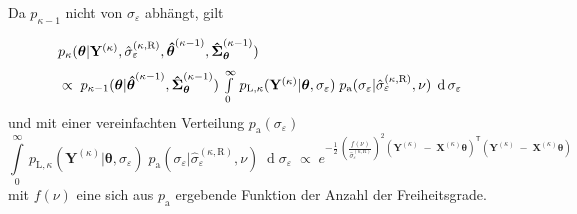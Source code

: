 Da $p_{\kappa-1}$ nicht von $\sigma_{\varepsilon}$ abhängt, gilt
\begin{equation}
\arraycolsep=2.0pt\def\arraystretch{2.0}
\begin{array}{l}
p_{\kappa}(\boldsymbol{\theta}| \mathbf{Y}^{(\kappa)}, \hat \sigma_{\varepsilon}^{(\kappa,\mathrm{R})},  \boldsymbol{\hat \theta}^{(\kappa-1)},  \boldsymbol{\hat \Sigma}^{(\kappa-1)}_{\boldsymbol{\theta}}) \\
\; \propto \; p_{\kappa-1}(\boldsymbol{\theta} | \boldsymbol{\hat \theta}^{(\kappa-1)}, 
\boldsymbol{\hat \Sigma}^{(\kappa-1)}_{\boldsymbol{\theta}}) \, 
\int\limits_0^\infty \, p_{\mathrm{L},\kappa} (\mathbf{Y}^{(\kappa)} | \boldsymbol{\theta},
\sigma_{\varepsilon}) \;
p_{\mathrm{a}} (\sigma_{\varepsilon} | \hat \sigma_{\varepsilon}^{(\kappa,\mathrm{R})}, \nu) \;
\operatorname{d}\sigma_{\varepsilon}
\end{array}
\end{equation}
und mit einer vereinfachten Verteilung $p_{\mathrm{a}}(\sigma_{\varepsilon})$
\begin{equation}
\int\limits_0^\infty \, p_{\mathrm{L},\kappa} (\mathbf{Y}^{(\kappa)} |
\boldsymbol{\theta}, \sigma_{\varepsilon}) \;
p_{\mathrm{a}} (\sigma_{\varepsilon} | \hat \sigma_{\varepsilon}^{(\kappa,\mathrm{R})}, \nu) \;
\operatorname{d}\sigma_{\varepsilon}
\; \propto \;
e^{- \frac{1}{2} \, \left(\frac{f(\nu)}{\hat \sigma_{\varepsilon}^{(\kappa,\mathrm{R})}}\right)^2
	\left(\mathbf{Y}^{(\kappa)} \; - \;  \mathbf{X}^{(\kappa)} \boldsymbol{\theta} \right)^\mathsf{T}
	\left(\mathbf{Y}^{(\kappa)} \; - \;  \mathbf{X}^{(\kappa)} \boldsymbol{\theta} \right)}
\end{equation}
mit $f(\nu)$ eine sich aus $p_{\mathrm{a}}$ ergebende Funktion der Anzahl der Freiheitsgrade.


